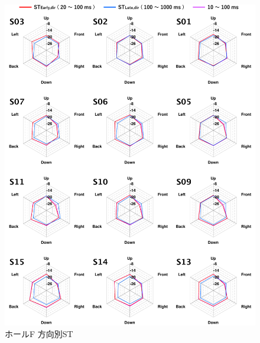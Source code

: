 \documentclass[11pt,a4j]{jreport}
\begin{document}
\newpage

\begin{figure}[H]
  \centering
  \includegraphics[scale=.77]{images/realHallDirSt/allPoint/reshaped/fRightPage.pdf}
  \caption*{ホールF 方向別ST}
\end{figure}

  
  \newpage
  
  \vspace{4\baselineskip}
\end{document}
